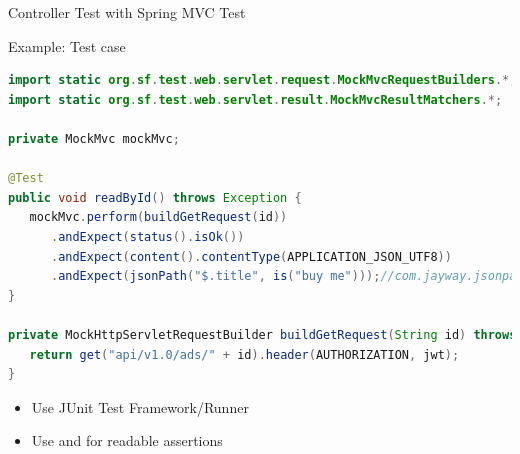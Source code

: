 \begin{frame}[fragile]{Controller Test with Spring MVC Test}
\begin{block}{Example: Test case}
\begin{lstlisting}[language=Java,belowskip=-3mm,aboveskip=0mm]
import static org.sf.test.web.servlet.request.MockMvcRequestBuilders.*;
import static org.sf.test.web.servlet.result.MockMvcResultMatchers.*;

private MockMvc mockMvc;

@Test
public void readById() throws Exception {
   mockMvc.perform(buildGetRequest(id))
      .andExpect(status().isOk())
      .andExpect(content().contentType(APPLICATION_JSON_UTF8))
      .andExpect(jsonPath("$.title", is("buy me")));//com.jayway.jsonpath:json-path
}

private MockHttpServletRequestBuilder buildGetRequest(String id) throws Exception {
   return get("api/v1.0/ads/" + id).header(AUTHORIZATION, jwt);
}
\end{lstlisting}
\end{block}
\begin{itemize}
\item Use JUnit Test Framework/Runner
\item Use  and  for readable assertions
\end{itemize}
\end{frame}

